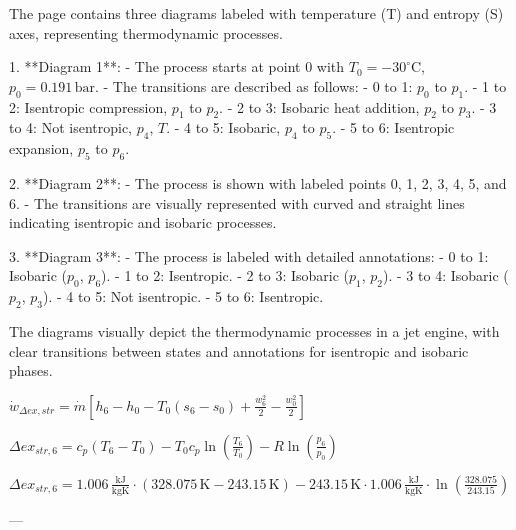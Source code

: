 The page contains three diagrams labeled with temperature (T) and entropy (S) axes, representing thermodynamic processes.  

1. **Diagram 1**:  
   - The process starts at point 0 with \( T_0 = -30^\circ \text{C} \), \( p_0 = 0.191 \, \text{bar} \).  
   - The transitions are described as follows:  
     - 0 to 1: \( p_0 \) to \( p_1 \).  
     - 1 to 2: Isentropic compression, \( p_1 \) to \( p_2 \).  
     - 2 to 3: Isobaric heat addition, \( p_2 \) to \( p_3 \).  
     - 3 to 4: Not isentropic, \( p_4 \), \( T \).  
     - 4 to 5: Isobaric, \( p_4 \) to \( p_5 \).  
     - 5 to 6: Isentropic expansion, \( p_5 \) to \( p_6 \).  

2. **Diagram 2**:  
   - The process is shown with labeled points 0, 1, 2, 3, 4, 5, and 6.  
   - The transitions are visually represented with curved and straight lines indicating isentropic and isobaric processes.  

3. **Diagram 3**:  
   - The process is labeled with detailed annotations:  
     - 0 to 1: Isobaric (\( p_0 \), \( p_6 \)).  
     - 1 to 2: Isentropic.  
     - 2 to 3: Isobaric (\( p_1 \), \( p_2 \)).  
     - 3 to 4: Isobaric (\( p_2 \), \( p_3 \)).  
     - 4 to 5: Not isentropic.  
     - 5 to 6: Isentropic.  

The diagrams visually depict the thermodynamic processes in a jet engine, with clear transitions between states and annotations for isentropic and isobaric phases.

\( \dot{w}_{\Delta ex, str} = \dot{m} \left[ h_6 - h_0 - T_0 (s_6 - s_0) + \frac{w_6^2}{2} - \frac{w_0^2}{2} \right] \)  

\( \Delta ex_{str,6} = c_p (T_6 - T_0) - T_0 c_p \ln \left( \frac{T_6}{T_0} \right) - R \ln \left( \frac{p_6}{p_0} \right) \)  

\( \Delta ex_{str,6} = 1.006 \, \frac{\text{kJ}}{\text{kgK}} \cdot (328.075 \, \text{K} - 243.15 \, \text{K}) - 243.15 \, \text{K} \cdot 1.006 \, \frac{\text{kJ}}{\text{kgK}} \cdot \ln \left( \frac{328.075}{243.15} \right) \)  

---